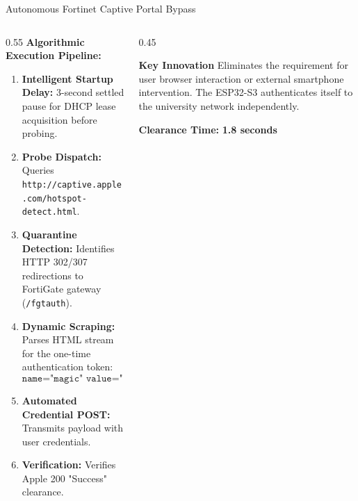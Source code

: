 \documentclass[aspectratio=169, 10pt]{beamer}
\begin{document}
\begin{frame}{Autonomous Fortinet Captive Portal Bypass}
    \begin{columns}[T]
        \begin{column}{0.55\textwidth}
            \textbf{Algorithmic Execution Pipeline:}
            \begin{enumerate}
                \item \textbf{Intelligent Startup Delay:} 3-second settled pause for DHCP lease acquisition before probing.
                \item \textbf{Probe Dispatch:} Queries \texttt{http://captive.apple.com/hotspot-detect.html}.
                \item \textbf{Quarantine Detection:} Identifies HTTP 302/307 redirections to FortiGate gateway (\texttt{/fgtauth}).
                \item \textbf{Dynamic Scraping:} Parses HTML stream for the one-time authentication token:
                $$\texttt{name="magic" value="([a-f0-9]+)"}$$
                \item \textbf{Automated Credential POST:} Transmits payload with user credentials.
                \item \textbf{Verification:} Verifies Apple 200 "Success" clearance.
            \end{enumerate}
        \end{column}
        
        \begin{column}{0.45\textwidth}
            \begin{block}{\textbf{Key Innovation}}
                Eliminates the requirement for user browser interaction or external smartphone intervention. The ESP32-S3 authenticates itself to the university network independently.
            \end{block}
            \vspace{0.2cm}
            \centering
            \textbf{Clearance Time:} \textcolor{codeGreen}{\textbf{1.8 seconds}}
        \end{column}
    \end{columns}
\end{frame}
\end{document}
